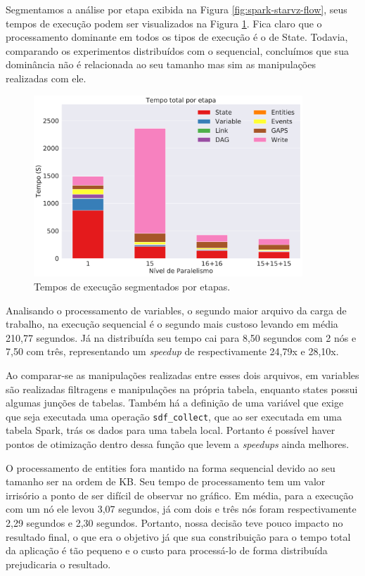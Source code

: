 Segmentamos a análise por etapa exibida na Figura \ref{fig:spark-starvz-flow}, 
seus tempos de execução podem ser visualizados na Figura \ref{fig:total_step}. 
Fica claro que o processamento dominante em todos os tipos de execução é o de 
State. Todavia, comparando os experimentos distribuídos com o sequencial, 
concluímos que sua dominância não é relacionada ao seu tamanho mas sim as 
manipulações realizadas com ele.

\begin{figure}[ht]
\centerline{
\includegraphics[width=0.9\textwidth]{./img/total_step.pdf}}
 \caption{Tempos de execução segmentados por etapas.}
 \label{fig:total_step}
\end{figure}

Analisando o processamento de variables, o segundo maior arquivo da carga de 
trabalho, na execução sequencial é o segundo mais custoso levando em média 
210,77 segundos. Já na distribuída seu tempo cai para 8,50 segundos com 2 nós e 
7,50 com três, representando um \emph{speedup} de respectivamente 24,79x e 
28,10x.

Ao comparar-se as manipulações realizadas entre esses dois arquivos, em 
variables são realizadas filtragens e manipulações na própria tabela, enquanto 
states possui algumas junções de tabelas. Também há a definição de uma variável 
que exige que seja executada uma operação \texttt{sdf\_collect}, que ao ser 
executada em uma tabela Spark, trás os dados para uma tabela local. Portanto é 
possível haver pontos de otimização dentro dessa função que levem a 
\emph{speedups} ainda melhores.

O processamento de entities fora mantido na forma sequencial devido ao seu 
tamanho ser na ordem de KB. Seu tempo de processamento tem um valor irrisório 
a ponto de ser difícil de observar no gráfico. Em média, para a execução com 
um nó ele levou 3,07 segundos, já com dois e três nós foram respectivamente 
2,29 segundos e 2,30 segundos. Portanto, nossa decisão teve pouco impacto no 
resultado final, o que era o objetivo já que sua constribuição para o tempo 
total da aplicação é tão pequeno e o custo para processá-lo de forma 
distribuída prejudicaria o resultado.

